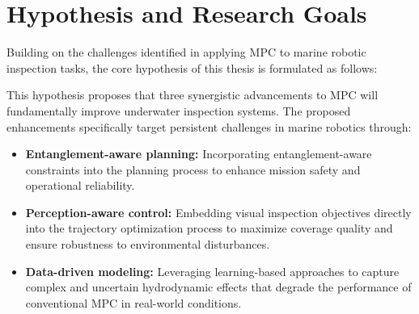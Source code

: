 


\section{Hypothesis and Research Goals}
Building on the challenges identified in applying \ac{MPC} to marine robotic inspection tasks, the core hypothesis of this thesis is formulated as follows:


\begin{figure}[h!]
    \centering
    
    \label{fig:revised_hypothesis_separate}
\end{figure}

This hypothesis proposes that three synergistic advancements to \ac{MPC} will fundamentally improve underwater inspection systems. The proposed enhancements specifically target persistent challenges in marine robotics through:

\begin{itemize}
    \item \textbf{Entanglement-aware planning:} Incorporating entanglement-aware constraints into the planning process to enhance mission safety and operational reliability.
    
      \item \textbf{Perception-aware control:} Embedding visual inspection objectives directly into the trajectory optimization process to maximize coverage quality and ensure robustness to environmental disturbances.
    
    \item \textbf{Data-driven modeling:} Leveraging learning-based approaches to capture complex and uncertain hydrodynamic effects that degrade the performance of conventional \ac{MPC} in real-world conditions.
    

\end{itemize}

